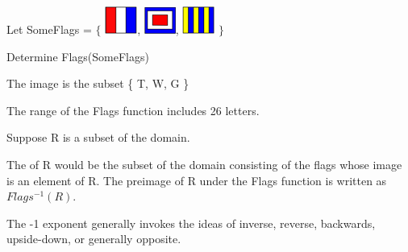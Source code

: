 \documentclass{ximera}
\begin{document}
\begin{exercise}
Let  SomeFlags = $\Bigg\{$  {\includegraphics[width=40px,height=34px]{pics/flags/T.png}}, {\includegraphics[width=39px,height=33px]{pics/flags/W.png}}, {\includegraphics[width=40px,height=34px]{pics/flags/G.png}}  $\Bigg\}$

Determine Flags(SomeFlags)

  \begin{selectAll}
  \end{selectAll}
  \begin{feedback}
The image is the subset \{ T, W, G  \}
  \end{feedback}
\end{exercise}













\begin{definition}
  The range of the Flags function includes 26 letters.  
    
  Suppose R is a subset of the domain.
  
  The  of R would be the subset of the domain consisting of the flags whose image is an element of R. The preimage of R under the Flags function is written as $Flags^{-1}(R)$.
 
 The -1 exponent generally invokes the ideas of inverse, reverse, backwards, upside-down, or generally opposite.
  
\end{definition}
\end{document}

